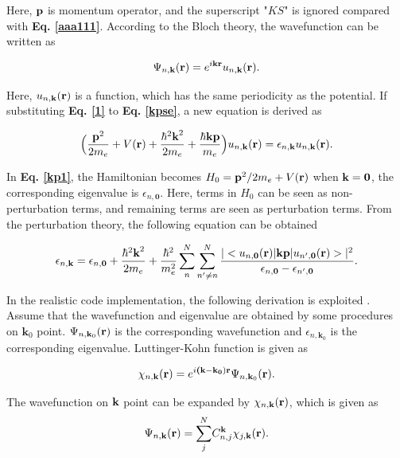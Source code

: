 \documentclass[a4paper, 12pt, titlepage,oneside,drop]{kthesis}
\begin{document}
Here, $\textbf p$ is momentum operator, and the superscript "$KS$" is ignored compared with \textbf{Eq. \ref{aaa111}}. According to the Bloch theory, the wavefunction can be written as

\begin{equation}\label{1}
 \wfbloch<n><\bold k> = \expg<k> \ubloch<n><\bold k>.
\end{equation}

Here, $\ubloch<n><\bold k>$ is a function, which has the same periodicity as the potential. If substituting \textbf{Eq. \ref{1}} to \textbf{Eq. \ref{kpse}}, a new equation is derived as

\begin{equation}\label{kp1}
 \Big(  \frac{{\textbf p}^2}{2m_e} + V({\textbf r }) + \frac{{\hbar^2 {\textbf k}^2}}{2m_e} + \frac{{\hbar \textbf {kp}}}{m_e} \Big) \ubloch<n><\bold  k>  =  \epsilon_{n,\textbf{k}} \ubloch<n><\bold  k>.
\end{equation}

In \textbf{Eq. \ref{kp1}}, the Hamiltonian becomes $H_0 = {\textbf p}^2 / {2m_e} + V({\textbf r })$ when $\textbf k = \textbf 0$, the corresponding eigenvalue is $\epsilon_{n,\textbf{0}}$. 
Here, terms in $H_0$ can be seen as non-perturbation terms, and remaining terms are seen as perturbation terms. From the perturbation theory, the following equation can be obtained  

\begin{equation}
 \epsilon_{n,\textbf{k}} =  \epsilon_{n,\textbf{0}} + \frac{{\hbar^2 {\textbf k}^2}}{2m_e} + \frac{ \hbar^2}{m_{e}^2} \sum\limits_n^{N} \sum\limits_{n' \neq n}^{N} \frac{|<\ubloch<n><\bold 0>|{\textbf {kp}}|\ubloch<n'><\bold  0>>|^2}{\epsilon_{n,\textbf 0} - \epsilon_{n',\textbf 0}}.
\end{equation}

In the realistic code implementation, the following derivation is exploited \cite{persson2007full}. Assume that the wavefunction and eigenvalue are obtained by some procedures on $\textbf{k}_0$ point. $\wfbloch<n><\bold{k}_0>$ is the corresponding wavefunction
and $\epsilon_{n,\textbf{k}_0}$ is the corresponding eigenvalue. Luttinger-Kohn function is given as

\begin{equation}\label{kp2}
\chikp<n><\textbf k> = \expg<(\bold k-\bold {k_0})>  \wfbloch<n><\textbf{k}_0>.
\end{equation}

The wavefunction on ${ \textbf k}$ point can be expanded by $\chikp<n><\textbf k> $, which is given as
\begin{equation}\label{kp3}
\wfbloch<n><\bold k> =  {\sum\limits_{j}^{N}} C_{n,j}^{\bold k} \chikp<j><\bold k>. 
\end{equation}
\end{document}

